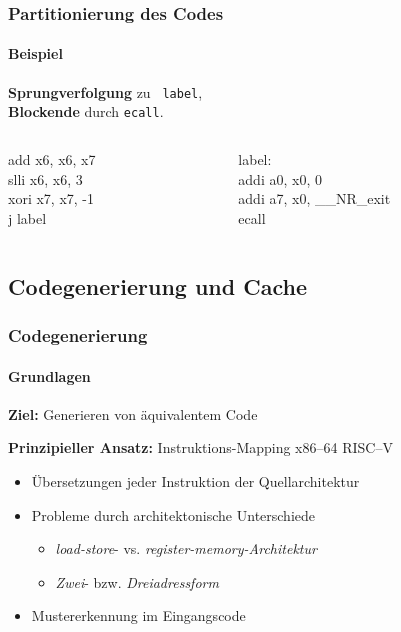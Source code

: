 \begin{frame}
	\frametitle{Partitionierung des Codes}
	\framesubtitle{Beispiel}

	\textbf{\color{blue} Sprungverfolgung} zu \texttt{\color{blue} label},\\
	\textbf{\color{red} Blockende} durch \texttt{\color{red}ecall}.

	\vspace{1.5cm}
	
	\begin{columns}[onlytextwidth]
		\ttfamily
		\begin{column}{0.49\textwidth}
			add  x6, x6, x7\\
			slli x6, x6, 3\\
			xori x7, x7, -1\\
			{\color{blue} j label}
		\end{column}
		
		\begin{column}{0.49\textwidth}
			{\color{blue} label:}\\
			addi a0, x0, 0\\
			addi a7, x0, \_\_NR\_exit\\
			{\color{red} ecall}
		\end{column}
	\end{columns}
\end{frame}


\subsection{Codegenerierung und Cache} %
\begin{frame}
	\frametitle{Codegenerierung}
	\framesubtitle{Grundlagen}
	\textbf{Ziel:} Generieren von äquivalentem Code
	
	\vspace{0.50cm}
	
	\textbf{Prinzipieller Ansatz:} Instruktions-Mapping x86--64 \conclude RISC--V
	
	\begin{itemize}
		\item Übersetzungen jeder Instruktion der Quellarchitektur
		\item Probleme durch architektonische Unterschiede
		\begin{itemize}
			\item \textit{load-store}- vs. \textit{register-memory-Architektur}
			\item \textit{Zwei}- bzw. \textit{Dreiadressform}
		\end{itemize}
		
		\item Mustererkennung im Eingangscode
	\end{itemize}
\end{frame}


